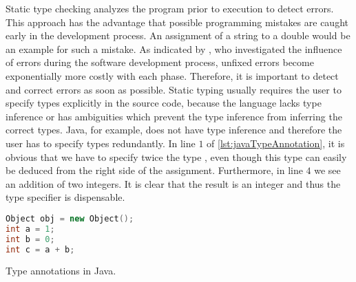 Static type checking analyzes the program prior to execution to detect errors.
This approach has the advantage that possible programming mistakes are caught early in the development process.
An assignment of a string to a double would be an example for such a mistake.
As indicated by \textcite{westland:jss2002a}, who investigated the influence of errors during the software development process, unfixed errors become exponentially more costly with each phase.
Therefore, it is important to detect and correct errors as soon as possible.
Static typing usually requires the user to specify types explicitly in the source code, because the language lacks type inference or has ambiguities which prevent the type inference from inferring the correct types.
Java, for example, does not have type inference and therefore the user has to specify types redundantly.
In line $1$ of \cref{lst:javaTypeAnnotation}, it is obvious that we have to specify twice the type , even though this type can easily be deduced from the right side of the assignment.
Furthermore, in line $4$ we see an addition of two integers.
It is clear that the result is an integer and thus the  type specifier is dispensable.
\begin{listing}[!h]
	\begin{CenteredBox}
		\begin{lstlisting}[language=C++,
		  commentstyle=\color{black},
		  stringstyle=\color{black},
		  keywordstyle=\color{black}\bfseries,
		  ]
Object obj = new Object();
int a = 1;
int b = 0;
int c = a + b;			
		\end{lstlisting}
	\end{CenteredBox}
	\caption{Type annotations in Java.}
	\label{lst:javaTypeAnnotation}
\end{listing}

